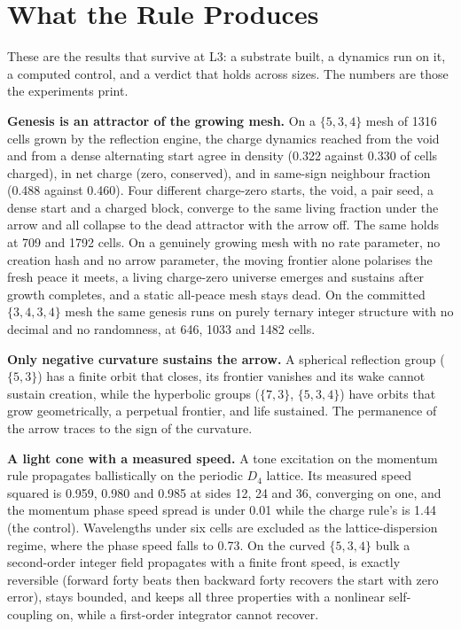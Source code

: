 \section{What the Rule Produces}

These are the results that survive at L3: a substrate built, a dynamics run on it, a computed control, and a verdict
that holds across sizes. The numbers are those the experiments print.

\textbf{Genesis is an attractor of the growing mesh.} On a $\{5,3,4\}$ mesh of 1316 cells grown by the reflection
engine, the charge dynamics reached from the void and from a dense alternating start agree in density (0.322 against
0.330 of cells charged), in net charge (zero, conserved), and in same-sign neighbour fraction (0.488 against 0.460).
Four different charge-zero starts, the void, a pair seed, a dense start and a charged block, converge to the same
living fraction under the arrow and all collapse to the dead attractor with the arrow off. The same holds at 709 and
1792 cells. On a genuinely growing mesh with no rate parameter, no creation hash and no arrow parameter, the moving
frontier alone polarises the fresh peace it meets, a living charge-zero universe emerges and sustains after growth
completes, and a static all-peace mesh stays dead. On the committed $\{3,4,3,4\}$ mesh the same genesis runs on
purely ternary integer structure with no decimal and no randomness, at 646, 1033 and 1482 cells.

\textbf{Only negative curvature sustains the arrow.} A spherical reflection group ($\{5,3\}$) has a finite orbit
that closes, its frontier vanishes and its wake cannot sustain creation, while the hyperbolic groups ($\{7,3\}$,
$\{5,3,4\}$) have orbits that grow geometrically, a perpetual frontier, and life sustained. The permanence of the
arrow traces to the sign of the curvature.

\textbf{A light cone with a measured speed.} A tone excitation on the momentum rule propagates ballistically on the
periodic $D_4$ lattice. Its measured speed squared is 0.959, 0.980 and 0.985 at sides 12, 24 and 36, converging on
one, and the momentum phase speed spread is under 0.01 while the charge rule's is 1.44 (the control). Wavelengths
under six cells are excluded as the lattice-dispersion regime, where the phase speed falls to 0.73. On the curved
$\{5,3,4\}$ bulk a second-order integer field propagates with a finite front speed, is exactly reversible (forward
forty beats then backward forty recovers the start with zero error), stays bounded, and keeps all three properties
with a nonlinear self-coupling on, while a first-order integrator cannot recover.

